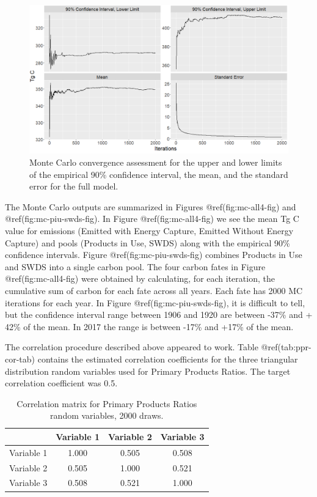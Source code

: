 \documentclass[
  openany]{book}
\begin{document}
\begin{figure}
\includegraphics[width=1\linewidth]{images/MC_conv} \caption{Monte Carlo convergence assessment for the upper and lower limits of the empirical 90\% confidence interval, the mean, and the standard error for the full model.}\label{fig:mc-conv-fig}
\end{figure}

The Monte Carlo outputs are summarized in Figures @ref(fig:mc-all4-fig)
and @ref(fig:mc-piu-swds-fig). In Figure @ref(fig:mc-all4-fig) we see
the mean Tg C value for emissions (Emitted with Energy Capture, Emitted
Without Energy Capture) and pools (Products in Use, SWDS) along with the
empirical 90\% confidence intervals. Figure @ref(fig:mc-piu-swds-fig)
combines Products in Use and SWDS into a single carbon pool. The four
carbon fates in Figure @ref(fig:mc-all4-fig) were obtained by
calculating, for each iteration, the cumulative sum of carbon for each
fate across all years. Each fate has 2000 MC iterations for each year.
In Figure @ref(fig:mc-piu-swds-fig), it is difficult to tell, but the
confidence interval range between 1906 and 1920 are between -37\% and +
42\% of the mean. In 2017 the range is between -17\% and +17\% of the
mean.

The correlation procedure described above appeared to work. Table
@ref(tab:ppr-cor-tab) contains the estimated correlation coefficients
for the three triangular distribution random variables used for Primary
Products Ratios. The target correlation coefficient was 0.5.

\begin{table}

\caption{\label{tab:ppr-cor-tab}Correlation matrix for Primary Products Ratios random variables, 2000 draws.}
\centering
\begin{tabular}[t]{lccc}
\toprule
  & Variable 1 & Variable 2 & Variable 3\\
\midrule
Variable 1 & 1.000 & 0.505 & 0.508\\
Variable 2 & 0.505 & 1.000 & 0.521\\
Variable 3 & 0.508 & 0.521 & 1.000\\
\bottomrule
\end{tabular}
\end{table}
\end{document}
